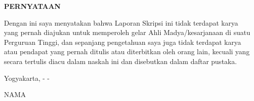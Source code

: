{}
\doublespacing
\begin{center}
	\textbf{PERNYATAAN}
\end{center}
\vspace{\baselineskip}

Dengan ini saya menyatakan bahwa Laporan Skripsi ini tidak terdapat karya yang
pernah diajukan untuk memperoleh gelar Ahli Madya/kesarjanaan di suatu Perguruan Tinggi, dan sepanjang pengetahuan saya juga tidak terdapat karya atau pendapat yang pernah ditulis atau diterbitkan oleh orang lain, kecuali yang secara tertulis diacu dalam naskah ini dan disebutkan dalam daftar pustaka.

\begin{flushright}
Yogyakarta, \hspace{20pt} -\hspace{20pt} - \the\year{}

\vspace{3\baselineskip}

NAMA
\end{flushright}
\singlespacing